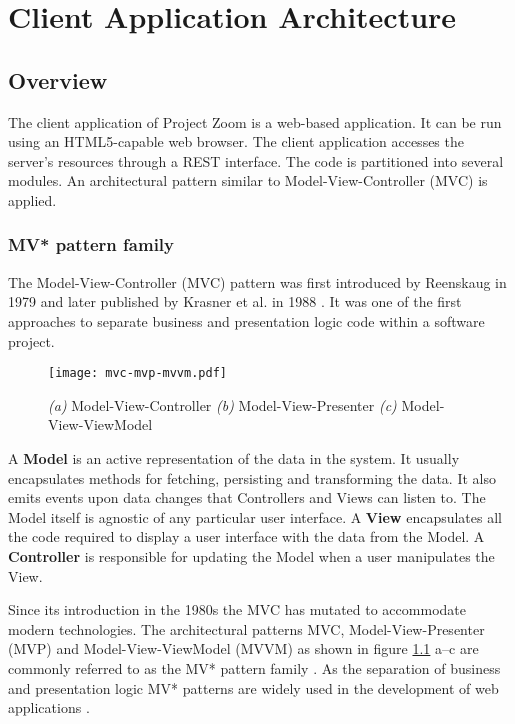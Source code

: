 \chapter{Client Application Architecture}

\section{Overview}
The client application of Project Zoom is a web-based application. It can be run using an HTML5-capable web browser. The client application accesses the server's resources through a REST interface. The code is partitioned into several modules. An architectural pattern similar to Model-View-Controller (MVC) is applied.

\subsection{MV* pattern family}
The Model-View-Controller (MVC) pattern was first introduced by Reenskaug in 1979 \cite{Reenskaug_1979} and later published by Krasner et al. in 1988 \cite{Krasner_1988}. It was one of the first approaches to separate business and presentation logic code within a software project.

\begin{figure}
\texttt{[image: mvc-mvp-mvvm.pdf]}
\caption[Diagrams of Model-View-Controller, Model-View-Presenter and Model-View-ViewModel]{\textit{(a)} Model-View-Controller \textit{(b)} Model-View-Presenter \textit{(c)} Model-View-ViewModel}
\label{fig:MV}
\end{figure}

A \textbf{Model} is an active representation of the data in the system. It usually encapsulates methods for fetching, persisting and transforming the data. It also emits events upon data changes that Controllers and Views can listen to. The Model itself is agnostic of any particular user interface. A \textbf{View} encapsulates all the code required to display a user interface with the data from the Model. A \textbf{Controller} is responsible for updating the Model when a user manipulates the View. \cite{Krasner_1988} \cite{Gamma_1994}

Since its introduction in the 1980s the MVC has mutated to accommodate modern technologies. The architectural patterns MVC, Model-View-Presenter (MVP) and Model-View-ViewModel (MVVM) as shown in figure \ref{fig:MV} a–c are commonly referred to as the MV* pattern family \cite{Osmani_2012}. As the separation of business and presentation logic MV* patterns are widely used in the development of web applications \cite{Takada_2012}.

